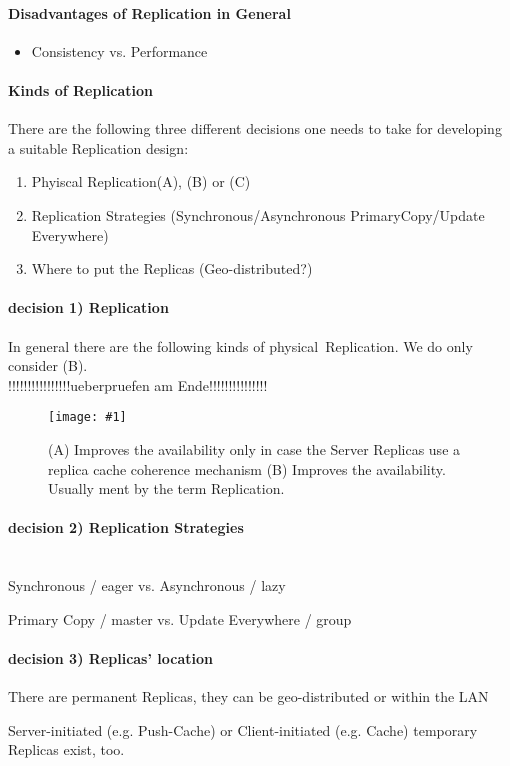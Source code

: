 \documentclass[a4paper,12pt]{article}%
\newcommand{\grafik}[2]{\begin{figure}[!htb]
		\noindent\texttt{[image: \#1]}
		\caption{\textrm{#2}}%
	\end{figure}}
\begin{document}
\paragraph{Disadvantages of Replication in General}
\begin{itemize}
	\item Consistency vs. Performance
\end{itemize}
\paragraph{Kinds of Replication}
There are the following three different decisions one needs to take for developing a suitable Replication design:
\begin{enumerate}
 \item \glqq Phyiscal Replication\grqq (A), (B) or (C)
 \item Replication Strategies (Synchronous/Asynchronous PrimaryCopy/Update Everywhere)
 \item Where to put the Replicas (Geo-distributed?)
\end{enumerate}


\paragraph{decision 1) Replication}
In general there are the following kinds of \glqq physical\grqq ~Replication. We do only consider (B).\\
\color{red} !!!!!!!!!!!!!!!!ueberpruefen am Ende!!!!!!!!!!!!!!! \color{black}
\grafik{src/Grafik01}{(A) Improves the availability only in case the Server Replicas use a replica cache coherence mechanism
	(B) Improves the availability. Usually ment by the term \glqq Replication\grqq.}
\paragraph{decision 2) Replication Strategies}~\\
Synchronous / eager vs. Asynchronous / lazy

Primary Copy / master vs. Update Everywhere / group

\paragraph{decision 3) Replicas' location}
There are permanent Replicas, they can be geo-distributed or within the LAN

Server-initiated (e.g. Push-Cache) or Client-initiated (e.g. Cache) temporary Replicas exist, too.
\end{document}
